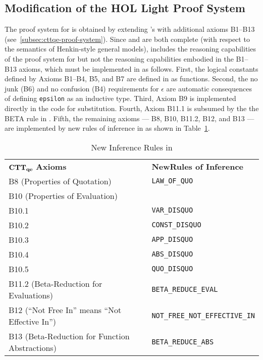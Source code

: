 \documentclass[fleqn]{llncs}
\begin{document}
\subsection{Modification of the HOL Light Proof System}\label{subsec:hlqe-proof-system}

The proof system for {\churchqe} is obtained by extending {\qzero}'s
with additional axioms B1--B13 (see~\ref{subsec:cttqe-proof-system}).
Since {\qzero} and {\HL} are both complete (with respect to the
semantics of Henkin-style general models), {\HL} includes the
reasoning capabilities of the proof system for {\qzero} but not the
reasoning capabilities embodied in the B1--B13 axioms, which must be
implemented in {\HLQE} as follows.  First, the logical constants
defined by Axioms B1--B4, B5, and B7 are defined in {\HLQE} as {\HOL}
functions.  Second, the no junk (B6) and no confusion (B4)
requirements for $\epsilon$ are automatic consequences of defining
\texttt{epsilon} as an inductive type.  Third, Axiom B9 is implemented
directly in the {\HL} code for substitution.  Fourth, Axiom B11.1 is
subsumed by the the BETA rule in {\HL}.  Fifth, the remaining axioms
--- B8, B10, B11.2, B12, and B13 --- are implemented by new rules of
inference in as shown in Table~\ref{tab:axioms}.

\begin{table}
\bc
\begin{tabular}{|ll|}
\hline
${\bf CTT_{qe}}$ \textbf{Axioms}                & \textbf{NewRules of Inference}\\
B8 (Properties of Quotation)                     & \texttt{LAW\_OF\_QUO}\\
B10 (Properties of Evaluation)                   & \texttt{}\\
B10.1                                            & \texttt{VAR\_DISQUO}\\
B10.2                                            & \texttt{CONST\_DISQUO}\\
B10.3                                            & \texttt{APP\_DISQUO}\\
B10.4                                            & \texttt{ABS\_DISQUO}\\
B10.5                                            & \texttt{QUO\_DISQUO}\\
B11.2 (Beta-Reduction for Evaluations)           & \texttt{BETA\_REDUCE\_EVAL}\\
B12 (``Not Free In'' means ``Not Effective In'') & \texttt{NOT\_FREE\_NOT\_EFFECTIVE\_IN}\\
B13 (Beta-Reduction for Function Abstractions)   & \texttt{BETA\_REDUCE\_ABS}\\
\hline
\end{tabular}
\ec
\caption{New Inference Rules in {\HLQE}}\label{tab:axioms} 
\end{table}
\end{document}
